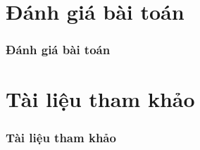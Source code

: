 \documentclass[10.5pt]{beamer}
\begin{document}
\section{\fontsize{8.5pt}{9.5pt}\selectfont Đánh giá bài toán}
\begin{frame}
	\frametitle{\fontsize{11.5pt}{12.5pt}\selectfont Đánh giá bài toán}
\end{frame}
\section{\fontsize{8.5pt}{9.5pt}\selectfont Tài liệu tham khảo}
\begin{frame}
	\frametitle{\fontsize{11.5pt}{12.5pt}\selectfont Tài liệu tham khảo}
\end{frame}
\end{document}
